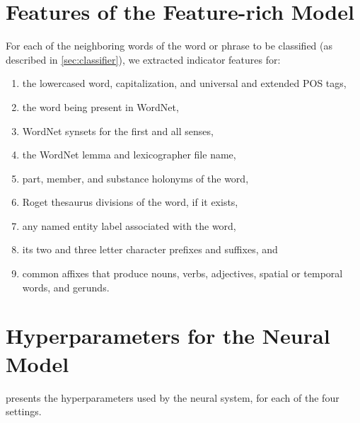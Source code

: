 \pdfoutput=1 \documentclass[11pt,a4paper]{article}
\begin{document}
\section{Features of the Feature-rich Model}

For each of the neighboring words of the word or phrase to be classified (as described in \cref{sec:classifier}),  we extracted indicator features for:
\begin{enumerate}[nosep]
\item the lowercased word, capitalization, and universal and extended
  POS tags,
\item the word being present in WordNet,
\item WordNet synsets for the first and all senses,
\item the WordNet lemma and lexicographer file name,
\item part, member, and substance holonyms of the word,
\item Roget thesaurus divisions of the word, if it exists,
\item any named entity label associated with the word,
\item its two and three letter character prefixes and suffixes, and
\item common affixes that produce nouns, verbs, adjectives, spatial or
  temporal words, and gerunds.
\end{enumerate}

\section{Hyperparameters for the Neural Model}

 presents the hyperparameters used by the neural system, for each of the four settings. 
\end{document}
